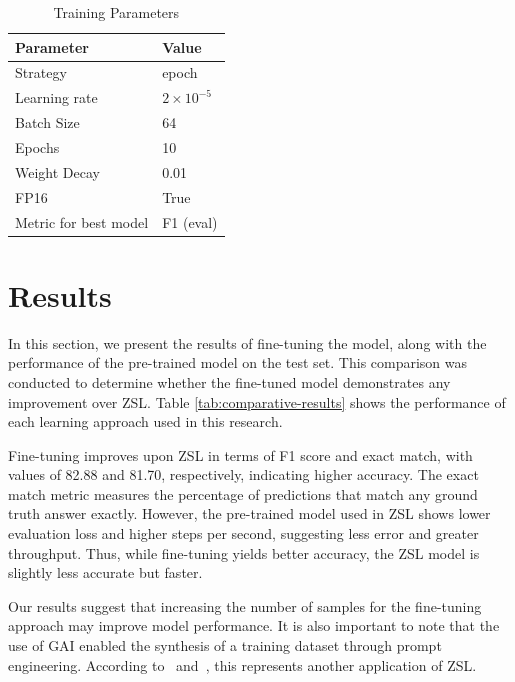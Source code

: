 \documentclass[runningheads]{llncs}
\begin{document}
\begin{table}[htbp]
\caption{\label{tab:org68816bf}Training Parameters}
\centering
\small
\begin{tabular}{ll}
  \hline
Parameter & Value\\[0pt]
\hline
Strategy & epoch\\[0pt]
Learning rate & \(2 \times 10^{-5}\)\\[0pt]
Batch Size & 64\\[0pt]
Epochs & 10\\[0pt]
Weight Decay & 0.01\\[0pt]
FP16 & True\\[0pt]
  Metric for best model & F1 (eval)\\[0pt]
  \hline
\end{tabular}
\end{table}

\section{Results}
\label{sec:results}

In this section, we present the results of fine-tuning the model,
along with the performance of the pre-trained model on the test
set. This comparison was conducted to determine whether the fine-tuned
model demonstrates any improvement over \ac{ZSL}. Table
\ref{tab:comparative-results} shows the performance of each learning
approach used in this research.

Fine-tuning improves upon \ac{ZSL} in terms of F1 score and exact
match, with values of 82.88 and 81.70, respectively, indicating higher
accuracy. The exact match metric measures the percentage of
predictions that match any ground truth answer exactly. However, the
pre-trained model used in \ac{ZSL} shows lower evaluation loss and
higher steps per second, suggesting less error and greater
throughput. Thus, while fine-tuning yields better accuracy, the
\ac{ZSL} model is slightly less accurate but faster.

Our results suggest that increasing the number of samples for the
fine-tuning approach may improve model performance. It is also
important to note that the use of \ac{GAI} enabled the synthesis of a
training dataset through prompt engineering. According
to~\cite{Ramesh2025} and~\cite{Rampur2018}, this represents another
application of \ac{ZSL}.
\end{document}

